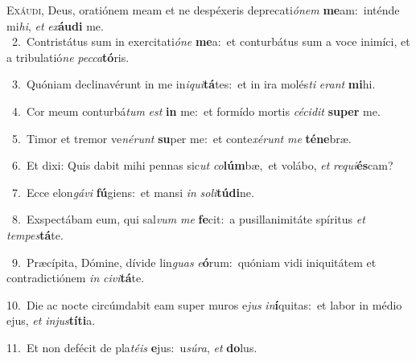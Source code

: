 \lettrine{\initial\textcolor{\initialcolor}{E}}{xáudi,} Deus, oratiónem meam et ne despéxeris deprecati\-\textit{ó}\-\textit{nem} \textbf{me}\-am:~\star inténde mi\-\textit{hi}\-, \textit{et} \textit{ex}\-\textbf{áu}\textbf{di} me.\\
{\numbfont\textcolor{\numbcolor}{~2.}}~Contristátus sum in exercitati\-\textit{ó}\-\textit{ne} \textbf{me}\-a:~\star et conturbátus sum a voce inimíci, et a tribulatió\textit{ne} \textit{pec}\-\textit{ca}\textbf{tó}ris.\par
{\numbfont\textcolor{\numbcolor}{~3.}}~Quóniam declinavérunt in me in\-\textit{i}\-\textit{qui}\textbf{tá}tes:~\star et in ira molés\textit{ti} \textit{e}\-\textit{rant} \textbf{mi}\-hi.\par
{\numbfont\textcolor{\numbcolor}{~4.}}~Cor meum conturbá\textit{tum} \textit{est} \textbf{in} me:~\star et formído mortis \textit{cé}\-\textit{ci}\textit{dit} \textbf{su}\-\textbf{per} me.\par
{\numbfont\textcolor{\numbcolor}{~5.}}~Timor et tremor ve\-\textit{né}\-\textit{runt} \textbf{su}\-per me:~\star et conte\-\textit{xé}\-\textit{runt} \textit{me} \textbf{té}\-\textbf{ne}bræ.\par
{\numbfont\textcolor{\numbcolor}{~6.}}~Et dixi: Quis dabit mihi pennas sic\textit{ut} \textit{co}\-\textbf{lúm}bæ,~\star et volábo, \textit{et} \textit{re}\-\textit{qui}\textbf{és}cam?\par
{\numbfont\textcolor{\numbcolor}{~7.}}~Ecce elon\-\textit{gá}\-\textit{vi} \textbf{fú}\-giens:~\star et mansi \textit{in} \textit{so}\-\textit{li}\textbf{tú}\textbf{di}ne.\par
{\numbfont\textcolor{\numbcolor}{~8.}}~Exspectábam eum, qui sal\textit{vum} \textit{me} \textbf{fe}\-cit:~\star a pusillanimitáte spíritus \textit{et} \textit{tem}\-\textit{pes}\textbf{tá}te.\par
{\numbfont\textcolor{\numbcolor}{~9.}}~Præcípita, Dómine, dívide lin\textit{guas} \textit{e}\-\textbf{ó}rum:~\star quóniam vidi iniquitátem et contradictiónem \textit{in} \textit{ci}\-\textit{vi}\textbf{tá}te.\par
{\numbfont\textcolor{\numbcolor}{10.}}~Die ac nocte circúmdabit eam super muros e\textit{jus} \textit{in}\-\textbf{í}quitas:~\star et labor in médio ejus, \textit{et} \textit{in}\-\textit{jus}\textbf{tí}\textbf{ti}a.\par
{\numbfont\textcolor{\numbcolor}{11.}}~Et non defécit de pla\-\textit{té}\-\textit{is} \textbf{e}\-jus:~\star u\-\textit{sú}\-\textit{ra}, \textit{et} \textbf{do}\-lus.\par
